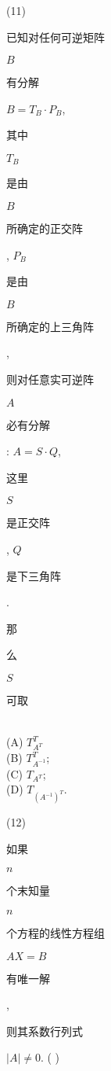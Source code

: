 \documentclass[10pt]{article}
\begin{document}
(11) \begin{CJK}{UTF8}{mj}已知对任何可逆矩阵\end{CJK} $B$ \begin{CJK}{UTF8}{mj}有分解\end{CJK} $B=T_{B} \cdot P_{B}$, \begin{CJK}{UTF8}{mj}其中\end{CJK} $T_{B}$ \begin{CJK}{UTF8}{mj}是由\end{CJK} $B$ \begin{CJK}{UTF8}{mj}所确定的正交阵\end{CJK}, $P_{B}$ \begin{CJK}{UTF8}{mj}是由\end{CJK} $B$ \begin{CJK}{UTF8}{mj}所确定的上三角阵\end{CJK}, \begin{CJK}{UTF8}{mj}则对任意实可逆阵\end{CJK} $A$ \begin{CJK}{UTF8}{mj}必有分解\end{CJK}: $A=S \cdot Q$, \begin{CJK}{UTF8}{mj}这里\end{CJK} $S$ \begin{CJK}{UTF8}{mj}是正交阵\end{CJK}, $Q$ \begin{CJK}{UTF8}{mj}是下三角阵\end{CJK}. \begin{CJK}{UTF8}{mj}那\end{CJK} \begin{CJK}{UTF8}{mj}么\end{CJK} $S$ \begin{CJK}{UTF8}{mj}可取\end{CJK}\\
(A) $T_{A^{T}}^{T}$\\
(B) $T_{A^{-1}}^{T}$;\\
(C) $T_{A^{T}}$;\\
(D) $T_{\left(A^{-1}\right)^{T}}$.

(12) \begin{CJK}{UTF8}{mj}如果\end{CJK} $n$ \begin{CJK}{UTF8}{mj}个末知量\end{CJK} $n$ \begin{CJK}{UTF8}{mj}个方程的线性方程组\end{CJK} $A X=B$ \begin{CJK}{UTF8}{mj}有唯一解\end{CJK},\begin{CJK}{UTF8}{mj}则其系数行列式\end{CJK} $|A| \neq 0$. ( )
\end{document}
